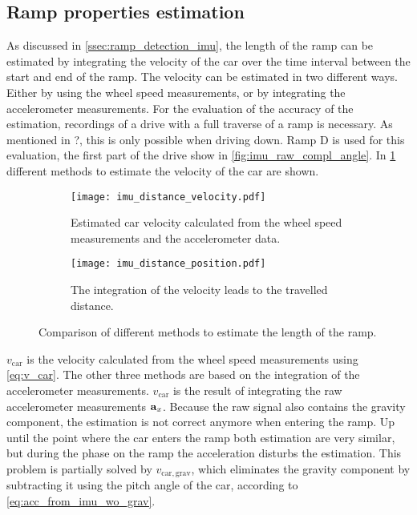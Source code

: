 \subsection{Ramp properties estimation}
As discussed in \cref{ssec:ramp_detection_imu}, the length of the ramp can be estimated by integrating the velocity of the car over the time interval between the start and end of the ramp.
The velocity can be estimated in two different ways.
Either by using the wheel speed measurements, or by integrating the accelerometer measurements.
For the evaluation of the accuracy of the estimation, recordings of a drive with a full traverse of a ramp is necessary.
As mentioned in ?, this is only possible when driving down.
Ramp D is used for this evaluation, the first part of the drive show in \cref{fig:imu_raw_compl_angle}.
In \cref{fig:imu_distance_velocity} different methods to estimate the velocity of the car are shown.
\begin{figure}[htb]
	\centering
	\begin{subfigure}{1\textwidth}
		\centering
		\texttt{[image: imu\_distance\_velocity.pdf]}
		\caption{Estimated car velocity calculated from the wheel speed measurements and the accelerometer data.}
		\label{fig:imu_distance_velocity}
	\end{subfigure}
	
	\begin{subfigure}{1\textwidth}
		\centering
		\texttt{[image: imu\_distance\_position.pdf]}
		\caption{The integration of the velocity leads to the travelled distance.}
		\label{fig:imu_distance_position}
	\end{subfigure}
	\caption{Comparison of different methods to estimate the length of the ramp.}
\end{figure}
$v_\mathrm{car}$ is the velocity calculated from the wheel speed measurements using \cref{eq:v_car}.
The other three methods are based on the integration of the accelerometer measurements.
$v_\mathrm{car}$ is the result of integrating the raw accelerometer measurements $\vb{a}_x$.
Because the raw signal also contains the gravity component, the estimation is not correct anymore when entering the ramp.
Up until the point where the car enters the ramp both estimation are very similar, but during the phase on the ramp the acceleration disturbs the estimation.
This problem is partially solved by $v_\mathrm{car, grav}$, which eliminates the gravity component by subtracting it using the pitch angle of the car, according to \cref{eq:acc_from_imu_wo_grav}.
